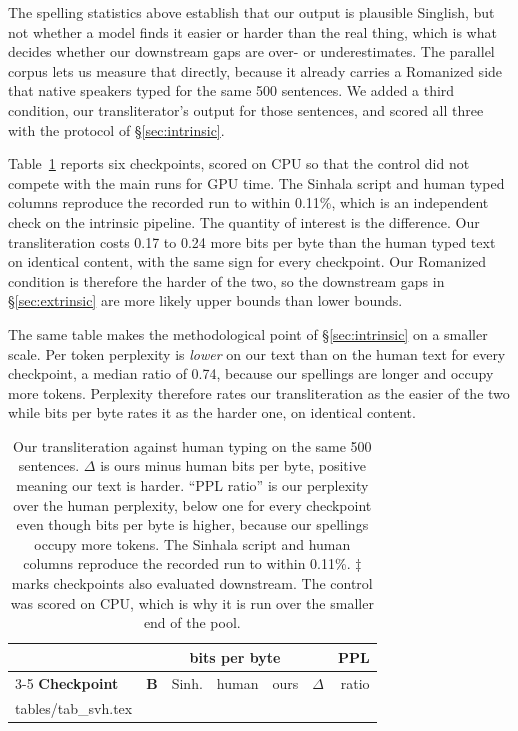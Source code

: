 \documentclass[11pt]{article}
\makeatletter
\newcommand{\rows}[1]{\@@input #1 }
\makeatother
\begin{document}
The spelling statistics above establish that our output is plausible Singlish, but
not whether a model finds it easier or harder than the real thing, which is what
decides whether our downstream gaps are over- or underestimates. The parallel
corpus lets us measure that directly, because it already carries a Romanized side
that native speakers typed for the same 500 sentences. We added a third condition,
our transliterator's output for those sentences, and scored all three with the
protocol of \S\ref{sec:intrinsic}.

Table~\ref{tab:svh} reports six checkpoints, scored on CPU so that the control did
not compete with the main runs for GPU time. The Sinhala script and human typed
columns reproduce the recorded run to within 0.11\%, which is an independent check on
the intrinsic pipeline. The quantity of interest is the difference. Our
transliteration costs 0.17 to 0.24 more bits per byte than the human typed text on
identical content, with the same sign for every checkpoint. Our Romanized condition
is therefore the harder of the two, so the downstream gaps in \S\ref{sec:extrinsic}
are more likely upper bounds than lower bounds.

The same table makes the methodological point of \S\ref{sec:intrinsic} on a smaller
scale. Per token perplexity is \emph{lower} on our text than on the human text for
every checkpoint, a median ratio of 0.74, because our spellings are longer and
occupy more tokens. Perplexity therefore rates our transliteration as the easier of
the two while bits per byte rates it as the harder one, on identical content.

\begin{table}[t]
\centering\scriptsize
\setlength{\tabcolsep}{2.6pt}
\begin{tabular}{@{}lr rrr rr@{}}
\toprule
& & \multicolumn{3}{c}{\textbf{bits per byte}} & & \textbf{PPL} \\
\cmidrule(lr){3-5}
\textbf{Checkpoint} & \textbf{B} & Sinh. & human & ours
& \boldmath$\Delta$ & ratio \\
\midrule
\rows{tables/tab_svh.tex}
\bottomrule
\end{tabular}
\caption{Our transliteration against human typing on the same 500 sentences.
$\Delta$ is ours minus human bits per byte, positive meaning our text is harder.
``PPL ratio'' is our perplexity over the human perplexity, below one for every
checkpoint even though bits per byte is higher, because our spellings occupy more
tokens. The Sinhala script and human columns reproduce the recorded run to within
0.11\%. $\ddagger$ marks checkpoints also evaluated downstream. The control was
scored on CPU, which is why it is run over the smaller end of the pool.}
\label{tab:svh}
\end{table}
\end{document}
